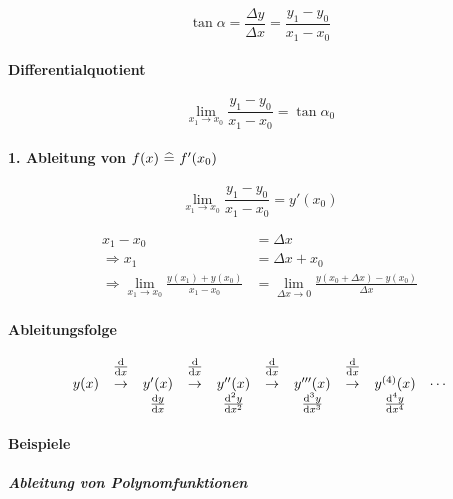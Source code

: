 \[
    \tan \alpha = \frac{\Delta y}{\Delta x} = \frac{y_1 - y_0}{x_1 - x_0}
\]

\paragraph{Differentialquotient}

\[
    \lim_{x_1 \rightarrow x_0} \frac{y_1 - y_0}{x_1 - x_0} = \tan \alpha_0
\]

\paragraph{1. Ableitung von \(f(x) \ \widehat{=}\  f'(x_0)\)}

\[
    \lim_{x_1 \rightarrow x_0} \frac{y_1 - y_0}{x_1 - x_0}= y'(x_0)
\]

\begin{align*}
    x_1 - x_0 &= \Delta x \\
    \Rightarrow x_1 &= \Delta x + x_0 \\
    \Rightarrow \lim_{x_1 \rightarrow x_0} \frac{y(x_1) + y(x_0)}{x_1 - x_0}
    &= \lim_{\Delta x \rightarrow 0} \frac{y(x_0 + \Delta x) - y(x_0)}{\Delta x}
\end{align*}

\paragraph{Ableitungsfolge}

\[
    \begin{array}{ccccccccccc}
        & \frac{\diff}{\diff x} &
        & \frac{\diff}{\diff x} &
        & \frac{\diff}{\diff x} &
        & \frac{\diff}{\diff x} & \\
        y(x)
        & \rightarrow & y'(x)
        & \rightarrow & y''(x)
        & \rightarrow & y'''(x)
        & \rightarrow & y^{(4)}(x)
        & \cdots \\
        & & \frac{\diff y}{\diff x}
        & & \frac{\diff^2 y}{\diff x^2}
        & & \frac{\diff^3 y}{\diff x^3}
        & & \frac{\diff^4 y}{\diff x^4}
    \end{array}
\]

\paragraph{Beispiele}

\subparagraph{Ableitung von Polynomfunktionen}

